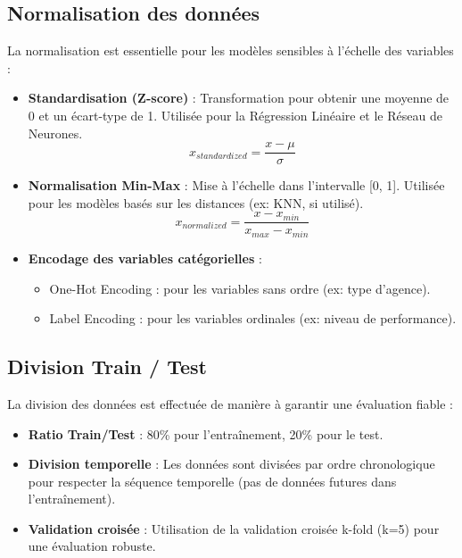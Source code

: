 \subsection{Normalisation des données}

La normalisation est essentielle pour les modèles sensibles à l'échelle des variables :

\begin{itemize}
    \item \textbf{Standardisation (Z-score)} : Transformation pour obtenir une moyenne de 0 et un écart-type de 1. Utilisée pour la Régression Linéaire et le Réseau de Neurones.
    \begin{equation}
        x_{standardized} = \frac{x - \mu}{\sigma}
    \end{equation}
    \item \textbf{Normalisation Min-Max} : Mise à l'échelle dans l'intervalle [0, 1]. Utilisée pour les modèles basés sur les distances (ex: KNN, si utilisé).
    \begin{equation}
        x_{normalized} = \frac{x - x_{min}}{x_{max} - x_{min}}
    \end{equation}
    \item \textbf{Encodage des variables catégorielles} :
        \begin{itemize}
            \item One-Hot Encoding : pour les variables sans ordre (ex: type d'agence).
            \item Label Encoding : pour les variables ordinales (ex: niveau de performance).
        \end{itemize}
\end{itemize}

\subsection{Division Train / Test}

La division des données est effectuée de manière à garantir une évaluation fiable :

\begin{itemize}
    \item \textbf{Ratio Train/Test} : 80\% pour l'entraînement, 20\% pour le test.
    \item \textbf{Division temporelle} : Les données sont divisées par ordre chronologique pour respecter la séquence temporelle (pas de données futures dans l'entraînement).
    \item \textbf{Validation croisée} : Utilisation de la validation croisée k-fold (k=5) pour une évaluation robuste.
\end{itemize}

